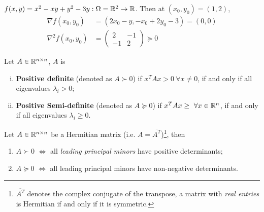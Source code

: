 \documentclass{article}
\begin{document}
	\begin{example}
		$f(x, y) = x^2 - xy + y^2 - 3y: \Omega = \mathbb{R}^2 \to \mathbb{R}$. Then at $(x_0, y_0) = (1, 2)$, 
		\begin{align}
			\nabla f(x_0, y_0) &= (2x_0 - y, -x_0 + 2y_0 - 3) = (0, 0) \\
			\nabla^2 f(x_0, y_0) &= 
			\begin{pmatrix}
				2 & -1 \\ -1 & 2
			\end{pmatrix} \succcurlyeq 0 
		\end{align}
	\end{example}
	
	\begin{definition}
		Let $A \in \mathbb{R}^{n \times n}$, $A$ is 
		\begin{enumerate}[(i)]
			\item \textbf{Positive definite} (denoted as $A \succ 0$) if $x^T A x > 0\ \forall x \neq 0$, if and only if all eigenvalues $\lambda_i > 0$;
			\item \textbf{Positive Semi-definite} (denoted as $A \succcurlyeq 0$) if $x^T A x \geq\  \forall x \in \mathbb{R}^n$, if and only if all eigenvalues $\lambda_i \geq 0$.
		\end{enumerate}
	\end{definition}
   	
   	\begin{theorem}
   		Let $A \in \mathbb{R}^{n \times n}$ be a Hermitian matrix (i.e. $A = \overline{A^T}$)\footnote{$\overline{A^T}$ denotes the complex conjugate of the transpose, a matrix with \emph{real entries} is Hermitian if and only if it is symmetric.}, then
   		\begin{enumerate}
   			\item $A \succ 0$ $\iff$ all \emph{leading principal minors} have positive determinants;
   			\item $A \succcurlyeq 0$ $\iff$ all leading principal minors have non-negative determinants.
   		\end{enumerate}
   	\end{theorem}
   	
   	
\end{document}
